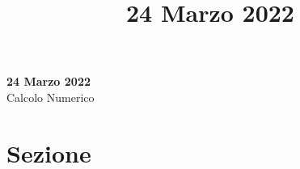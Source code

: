 \documentclass[11pt]{article}
\theoremstyle{definition}
\theoremstyle{plain}
\begin{document}
\title{24 Marzo 2022}

\thispagestyle{empty}

\begin{center}
{\LARGE \bf 24 Marzo 2022}\\
{\large Calcolo Numerico}\\
\end{center}

\section{Sezione}




	
\end{document}
